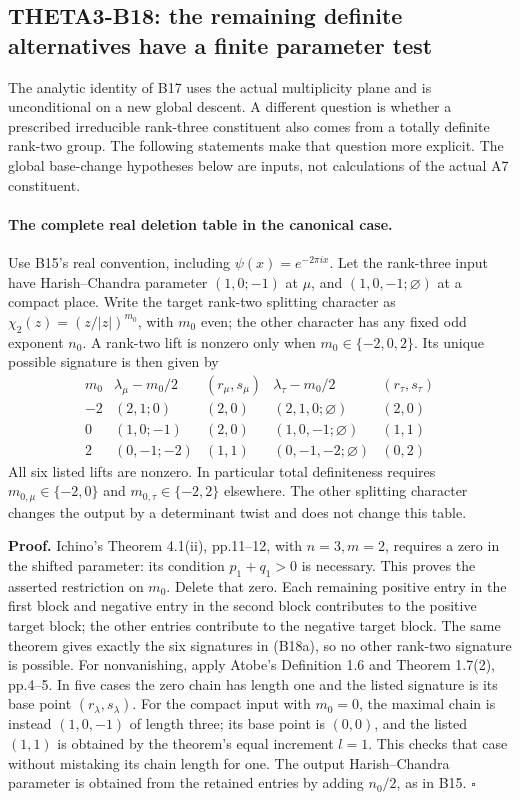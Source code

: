 \subsection{THETA3-B18: the remaining definite alternatives have a finite parameter test}\label{B18}

The analytic identity of B17 uses the actual multiplicity plane and
is unconditional on a new global descent. A different question is
whether a prescribed irreducible rank-three constituent also comes
from a totally definite rank-two group. The following statements
make that question more explicit. The global base-change hypotheses
below are inputs, not calculations of the actual A7 constituent.

\paragraph{The complete real deletion table in the canonical case.}
Use B15's real convention, including $\psi(x)=e^{-2\pi i x}$.
Let the rank-three input have Harish--Chandra parameter
$(1,0;-1)$ at $\mu$, and $(1,0,-1;\varnothing)$ at a compact
place. Write the target rank-two splitting character as
$\chi_2(z)=(z/|z|)^{m_0}$, with $m_0$ even; the other character
has any fixed odd exponent $n_0$. A rank-two lift is nonzero
only when $m_0\in\{-2,0,2\}$. Its unique possible signature is
then given by
\[
\begin{array}{c|c|c|c|c}
 m_0&\lambda_\mu-m_0/2&(r_\mu,s_\mu)
       &\lambda_\tau-m_0/2&(r_\tau,s_\tau)\\ \hline
 -2&(2,1;0)&(2,0)&(2,1,0;\varnothing)&(2,0)\\
 0 &(1,0;-1)&(2,0)&(1,0,-1;\varnothing)&(1,1)\\
 2 &(0,-1;-2)&(1,1)&(0,-1,-2;\varnothing)&(0,2)
\end{array}
\tag{B18a}
\]
All six listed lifts are nonzero. In particular total definiteness
requires $m_{0,\mu}\in\{-2,0\}$ and
$m_{0,\tau}\in\{-2,2\}$ elsewhere. The other splitting character
changes the output by a determinant twist and does not change this
table.

\textbf{Proof.}
Ichino's Theorem 4.1(ii), pp.11--12, with $n=3,m=2$, requires a
zero in the shifted parameter: its condition $p_1+q_1>0$ is
necessary. This proves the asserted restriction on $m_0$.
Delete that zero. Each remaining positive entry in the first
block and negative entry in the second block contributes to the
positive target block; the other entries contribute to the
negative target block. The same theorem gives exactly the six
signatures in (B18a), so no other rank-two signature is possible.
For nonvanishing, apply Atobe's Definition 1.6 and Theorem 1.7(2),
pp.4--5. In five cases the zero chain has length one and the
listed signature is its base point $(r_\lambda,s_\lambda)$.
For the compact input with $m_0=0$, the maximal chain is instead
$(1,0,-1)$ of length three; its base point is $(0,0)$, and the
listed $(1,1)$ is obtained by the theorem's equal increment
$l=1$. This checks that case without mistaking its chain length
for one. The output Harish--Chandra parameter is obtained from
the retained entries by adding $n_0/2$, as in B15.
\hfill$\square$

